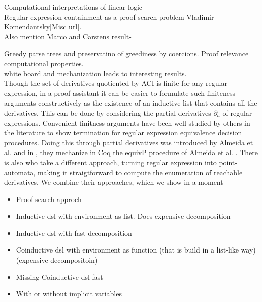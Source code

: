 
Computational interpretations of linear logic \cite{A93}\\
Regular expression containment as a proof search problem Vladimir Komendantsky[Misc url].\\
Also mention Marco and Carstens result-

Greedy parse trees and preservatino of greediness by coercions. Proof relevance computational properties.\\
white board and mechanization leads to interesting results.
\\
Though the set of derivatives quotiented by ACI is finite for any regular expression, in a proof assistant it can be easier to formulate such finiteness arguments constructively as the existence of an inductive list that contains all the derivatives. This can be done by considering the partial derivatives $\partial_a$ of regular expressions. Convenient finitness arguments have been well studied by others in the literature to show termination for regular expression equivalence decision procedures. Doing this through partial derivatives was introduced by Almeida et al. \cite{AMR09} and in \cite{MPS12}, they mechanize in Coq the \textsf{equivP} procedure of Almeida et al. . There is also \cite{A12} who take a different approach, turning regular expression into point-automata, making it straigtforward to compute the enumeration of reachable derivatives. We combine their approaches, which we show in a moment
\\
\begin{itemize}
\item Proof search approch
\item Inductive dsl with environment as list. Does expensive decomposition
\item Inductive dsl with fast decomposition
\item Coinductive dsl with environment as function (that is build in a list-like way) (expensive decompositoin)
\item Missing Coinductive dsl fast
\item With or without implicit variables
\end{itemize}


